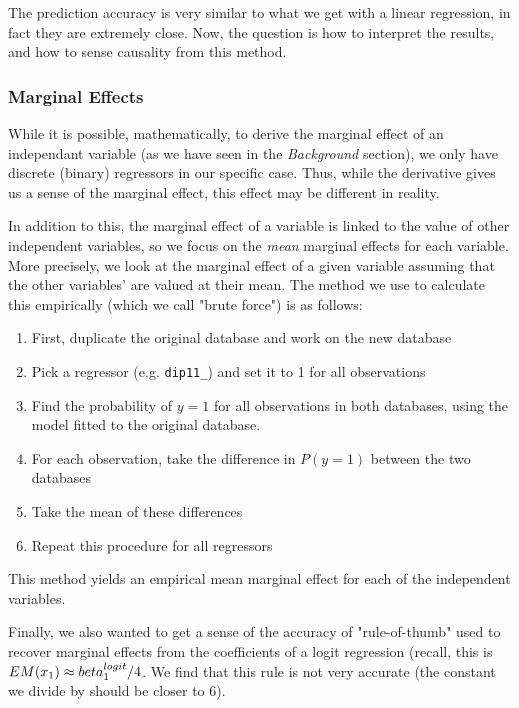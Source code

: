 The prediction accuracy is very similar to what we get with a linear regression, in fact they are extremely close. Now, the question is how to interpret the results, and how to sense causality from this method.

\subsubsection{Marginal Effects}
While it is possible, mathematically, to derive the marginal effect of an independant variable (as we have seen in the \textit{Background} section), we only have discrete (binary) regressors in our specific case. Thus, while the derivative gives us a sense of the marginal effect, this effect may be different in reality.

In addition to this, the marginal effect of a variable is linked to the value of other independent variables, so we focus on the \textit{mean} marginal effects for each variable. More precisely, we look at the marginal effect of a given variable assuming that the other variables' are valued at their mean. The method we use to calculate this empirically (which we call "brute force") is as follows:

\begin{enumerate}
    \item First, duplicate the original database and work on the new database
    \item Pick a regressor (e.g. \texttt{dip11\_}) and set it to 1 for all observations
    \item Find the probability of $y=1$ for all observations in both databases, using the model fitted to the original database.
    \item For each observation, take the difference in $P(y=1)$ between the two databases
    \item Take the mean of these differences
    \item Repeat this procedure for all regressors
\end{enumerate}

This method yields an empirical mean marginal effect for each of the independent variables.

Finally, we also wanted to get a sense of the accuracy of "rule-of-thumb" used to recover marginal effects from the coefficients of a logit regression (recall, this is $EM(x_1) \approx \\beta_1^{logit}/4$. We find that this rule is not very accurate (the constant we divide by should be closer to $6$).

